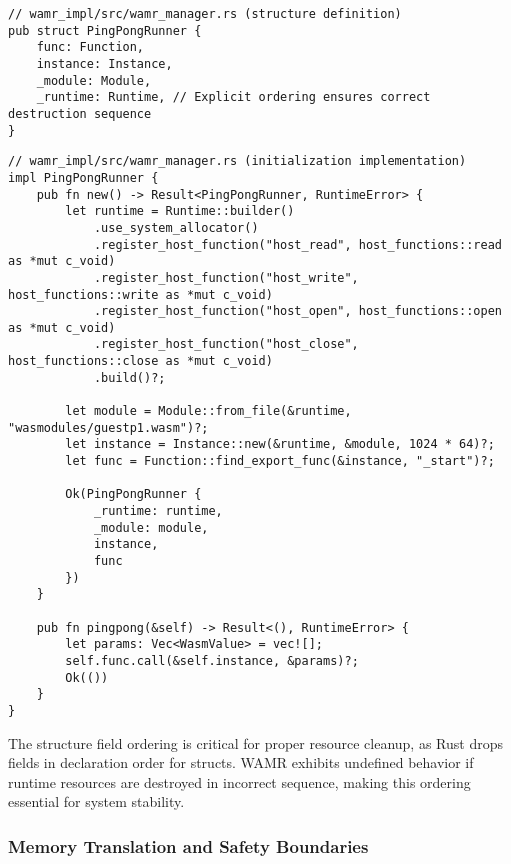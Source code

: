 \begin{verbatim}
// wamr_impl/src/wamr_manager.rs (structure definition)
pub struct PingPongRunner {
    func: Function,
    instance: Instance,
    _module: Module,
    _runtime: Runtime, // Explicit ordering ensures correct destruction sequence
}
\end{verbatim}

\begin{verbatim}
// wamr_impl/src/wamr_manager.rs (initialization implementation)
impl PingPongRunner {
    pub fn new() -> Result<PingPongRunner, RuntimeError> {
        let runtime = Runtime::builder()
            .use_system_allocator()
            .register_host_function("host_read", host_functions::read as *mut c_void)
            .register_host_function("host_write", host_functions::write as *mut c_void)
            .register_host_function("host_open", host_functions::open as *mut c_void)
            .register_host_function("host_close", host_functions::close as *mut c_void)
            .build()?;

        let module = Module::from_file(&runtime, "wasmodules/guestp1.wasm")?;
        let instance = Instance::new(&runtime, &module, 1024 * 64)?;
        let func = Function::find_export_func(&instance, "_start")?;
        
        Ok(PingPongRunner { 
            _runtime: runtime, 
            _module: module, 
            instance, 
            func 
        })
    }

    pub fn pingpong(&self) -> Result<(), RuntimeError> {
        let params: Vec<WasmValue> = vec![];
        self.func.call(&self.instance, &params)?;
        Ok(())
    }
}
\end{verbatim}

The structure field ordering is critical for proper resource cleanup, as Rust drops fields in declaration order for structs. WAMR exhibits undefined behavior if runtime resources are destroyed in incorrect sequence, making this ordering essential for system stability.

\subsubsection{Memory Translation and Safety Boundaries}

